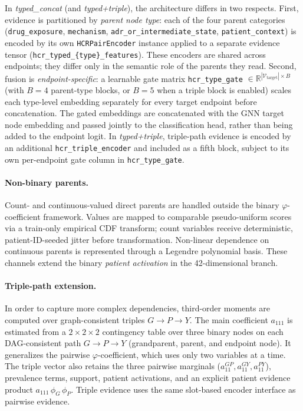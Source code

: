 In \emph{typed\_concat} (and \emph{typed+triple}), the architecture differs
in two respects.
First, evidence is partitioned by \emph{parent node type}: each of the four
parent categories
(\texttt{drug\_exposure}, \texttt{mechanism},
\texttt{adr\_or\_intermediate\_state}, \texttt{patient\_context}) is encoded
by its own \texttt{HCRPairEncoder} instance applied to a separate evidence
tensor (\texttt{hcr\_typed\_\{type\}\_features}).
These encoders are shared across endpoints; they differ only in the semantic
role of the parents they read.
Second, fusion is \emph{endpoint-specific}: a learnable gate matrix
\texttt{hcr\_type\_gate} $\in \mathbb{R}^{|\mathcal{V}_{\text{target}}| \times B}$
(with $B=4$ parent-type blocks, or $B=5$ when a triple block is enabled)
scales each type-level embedding separately for every target endpoint before
concatenation.
The gated embeddings are concatenated with the GNN target node embedding and
passed jointly to the classification head, rather than being added to the
endpoint logit.
In \emph{typed+triple}, triple-path evidence is encoded by an additional
\texttt{hcr\_triple\_encoder} and included as a fifth block, subject to its
own per-endpoint gate column in \texttt{hcr\_type\_gate}.

\paragraph{Non-binary parents.}
Count- and continuous-valued direct parents are handled outside the binary
\(\varphi\)-coefficient framework. Values are mapped to comparable
pseudo-uniform scores via a train-only empirical CDF transform; count
variables receive deterministic, patient-ID-seeded jitter before
transformation. Non-linear dependence on continuous parents is represented
through a Legendre polynomial basis. These channels extend  the binary \emph{patient activation} 
in the 42-dimensional branch.

\paragraph{Triple-path extension.}
In order to capture more complex dependencies,
third-order moments are computed over graph-consistent
triples \(G \rightarrow P \rightarrow Y\). The main coefficient $a_{111}$ 
is estimated from a $2 \times 2 \times 2$
contingency table over three binary nodes on each DAG-consistent path
$G \rightarrow P \rightarrow Y$ (grandparent, parent, and endpoint node).
It generalizes the pairwise $\varphi$-coefficient, which uses only two
variables at a time.
The triple vector also retains the three pairwise marginals
(\(a_{11}^{GP}, a_{11}^{GY}, a_{11}^{PY}\)), prevalence terms, support,
patient activations, and an explicit patient evidence product
\(a_{111}\,\phi_G\,\phi_P\). 
Triple evidence uses the same slot-based encoder
interface as pairwise evidence.

